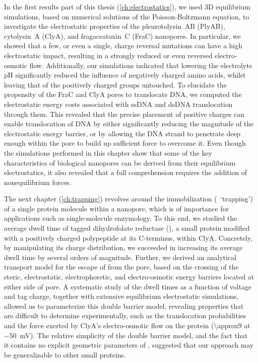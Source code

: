 In the first results part of this thesis (\cref{ch:electrostatics}), we used 3D equilibrium simulations, based
on numerical solutions of the Poisson-Boltzmann equation, to investigate the electrostatic properties of the
pleurotolysin~AB (PlyAB), cytolysin~A (ClyA), and fragaceatoxin~C (FraC) nanopores. In particular, we showed
that a few, or even a single, charge reversal mutations can have a high electrostatic impact, resulting in a
strongly reduced or even reversed electro-osmotic flow. Additionally, our simulations indicated that lowering
the electrolyte pH significantly reduced the influence of negatively charged amino acids, whilst leaving that
of the positively charged groups untouched. To elucidate the propensity of the FraC and ClyA pores to
translocate DNA, we computed the electrostatic energy costs associated with ssDNA and dsDNA translocation
through them. This revealed that the precise placement of positive charges can enable translocation of DNA by
either significantly reducing the magnitude of the electrostatic energy barrier, or by allowing the DNA strand
to penetrate deep enough within the pore to build up sufficient force to overcome it. Even though the
simulations performed in this chapter show that some of the key characteristics of biological nanopores can be
derived from their equilibrium electrostatics, it also revealed that a full comprehension requires the
addition of nonequilibrium forces.

The next chapter (\cref{ch:trapping}) revolves around the immobilization (\ie~`trapping') of a single protein
molecule within a nanopore, which is of importance for applications such as single-molecule enzymology. To
this end, we studied the average dwell time of tagged dihydrofolate reductase (\DHFRt{}), a small protein
modified with a positively charged polypeptide at its C-terminus, within ClyA. Concretely, by manipulating its
charge distribution, we succeeded in increasing its average dwell time by several orders of magnitude.
Further, we derived an analytical transport model for the escape of \DHFRt{} from the pore, based on the
crossing of the steric, electrostatic, electrophoretic, and electro-osmotic energy barriers located at either
side of pore. A systematic study of the dwell times as a function of voltage and tag charge, together with
extensive equilibrium electrostatic simulations, allowed us to parameterize this double barrier model,
revealing properties that are difficult to determine experimentally, such as the translocation probabilities
and the force exerted by ClyA's electro-osmotic flow on the protein (\SI{\approx9}{\pN} at \SI{-50}{\mV}). The
relative simplicity of the double barrier model, and the fact that it contains no explicit geometric
parameters of \DHFRt{}, suggested that our approach may be generalizable to other small proteins.

